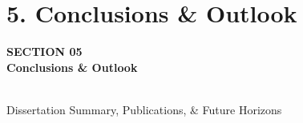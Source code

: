 \documentclass[10pt,aspectratio=169]{beamer}
\begin{document}
\section{5. Conclusions \& Outlook}
{
\begin{frame}[plain]
  \vfill
  \begin{center}
    {\tiny\color{AmberAccent}\bfseries SECTION 05} \\[4pt]
    {\Huge\bfseries\color{White} Conclusions \& Outlook} \\[8pt]
     \\[8pt]
    {\small\color{CardBorder} Dissertation Summary, Publications, \& Future Horizons}
  \end{center}
  \vfill
\end{frame}
}
\end{document}
